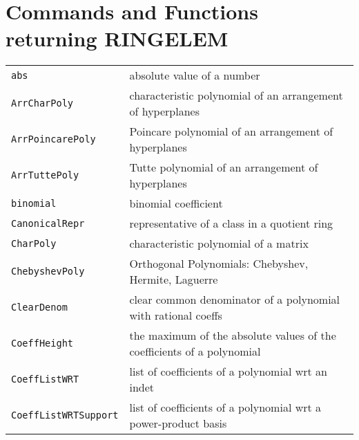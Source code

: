 \documentclass[a4paper]{mybook}
\begin{document}
\noindent



\section{Commands and Functions returning RINGELEM}
\label{Commands and Functions returning RINGELEM}

        

\begin{center}
\begin{longtable}{ll}
   
{\verb~abs~} &
      absolute value of a number\\
   
{\verb~ArrCharPoly~} &
      characteristic polynomial of an arrangement of hyperplanes\\
   
{\verb~ArrPoincarePoly~} &
      Poincare polynomial of an arrangement of hyperplanes\\
   
{\verb~ArrTuttePoly~} &
      Tutte polynomial of an arrangement of hyperplanes\\
   
{\verb~binomial~} &
      binomial coefficient\\
   
{\verb~CanonicalRepr~} &
      representative of a class in a quotient ring\\
   
{\verb~CharPoly~} &
      characteristic polynomial of a matrix\\
   
{\verb~ChebyshevPoly~} &
      Orthogonal Polynomials: Chebyshev, Hermite, Laguerre\\
   
{\verb~ClearDenom~} &
      clear common denominator of a polynomial with rational coeffs\\
   
{\verb~CoeffHeight~} &
      the maximum of the absolute values of the coefficients of a polynomial\\
   
{\verb~CoeffListWRT~} &
      list of coefficients of a polynomial wrt an indet\\
   
{\verb~CoeffListWRTSupport~} &
      list of coefficients of a polynomial wrt a power-product basis\\
   

\end{longtable}
\end{center}
\end{document}
